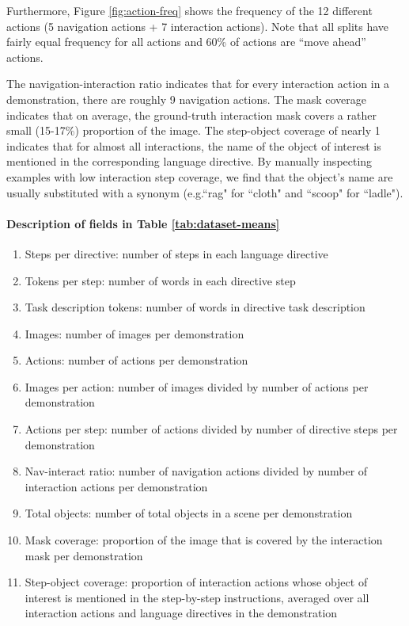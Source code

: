 \documentclass[11pt,a4paper]{article}
\begin{document}
Furthermore, Figure \ref{fig:action-freq} shows the frequency of the 12 different actions (5 navigation actions + 7 interaction actions). Note that all splits have fairly equal frequency for all actions and 60\% of actions are ``move ahead'' actions.

The navigation-interaction ratio indicates that for every interaction action in a demonstration, there are roughly 9 navigation actions. The mask coverage indicates that on average, the ground-truth interaction mask covers a rather small (15-17\%) proportion of the image. The step-object coverage of nearly 1 indicates that for almost all interactions, the name of the object of interest is mentioned in the corresponding language directive. By manually inspecting examples with low interaction step coverage, we find that the object's name are usually substituted with a synonym (e.g.``rag" for ``cloth" and ``scoop" for ``ladle").

\paragraph{Description of fields in Table \ref{tab:dataset-means}}
\begin{enumerate}
    \item Steps per directive: number of steps in each language directive
    \item Tokens per step: number of words in each directive step
    \item Task description tokens: number of words in directive task description
    \item Images: number of images per demonstration
    \item Actions: number of actions per demonstration
    \item Images per action: number of images divided by number of actions per demonstration
    \item Actions per step: number of actions divided by number of directive steps per demonstration
    \item Nav-interact ratio: number of navigation actions divided by number of interaction actions per demonstration
    \item Total objects: number of total objects in a scene per demonstration
    \item Mask coverage: proportion of the image that is covered by the interaction mask per demonstration
    \item Step-object coverage: proportion of interaction actions whose object of interest is mentioned in the step-by-step instructions, averaged over all interaction actions and language directives in the demonstration
\end{enumerate}
\end{document}
